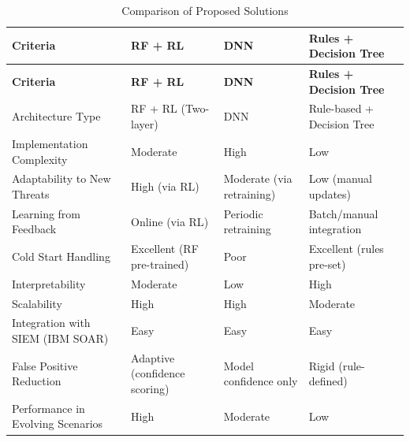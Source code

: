 \captionsetup[table]{font=small} %
\scriptsize %
\begin{longtable}{@{}P{3cm}P{3cm}P{4cm}P{4cm}@{}}
    \caption{Comparison of Proposed Solutions}
    \label{tab:solution_comparison} \\
    \toprule
    \textbf{Criteria} & \textbf{\gls{RF} + \gls{RL}} & \textbf{\gls{DNN}} & \textbf{Rules + Decision Tree} \\
    \midrule
    \endfirsthead

    \toprule
    \textbf{Criteria} & \textbf{\gls{RF} + \gls{RL}} & \textbf{\gls{DNN}} & \textbf{Rules + Decision Tree} \\
    \midrule
    \endhead

    \bottomrule
    \endfoot

    \bottomrule
    \endlastfoot

    Architecture Type & \gls{RF} + \gls{RL} (Two-layer) & \gls{DNN} & Rule-based + Decision Tree \\
    \vspace{0.2cm}
    Implementation Complexity & Moderate & High & Low \\
    \vspace{0.2cm}
    Adaptability to New Threats & High (via \gls{RL}) & Moderate (via retraining) & Low (manual updates) \\
    \vspace{0.2cm}
    Learning from Feedback & Online (via \gls{RL}) & Periodic retraining & Batch/manual integration \\
    \vspace{0.2cm}
    Cold Start Handling & Excellent (\gls{RF} pre-trained) & Poor & Excellent (rules pre-set) \\
    \vspace{0.2cm}
    Interpretability & Moderate & Low & High \\
    \vspace{0.2cm}
    Scalability & High & High & Moderate \\
    \vspace{0.2cm}
    Integration with SIEM (IBM SOAR) & Easy & Easy & Easy \\
    \vspace{0.2cm}
    False Positive Reduction & Adaptive (confidence scoring) & Model confidence only & Rigid (rule-defined) \\
    \vspace{0.2cm}
    Performance in Evolving Scenarios & High & Moderate & Low \\
    
\end{longtable}

